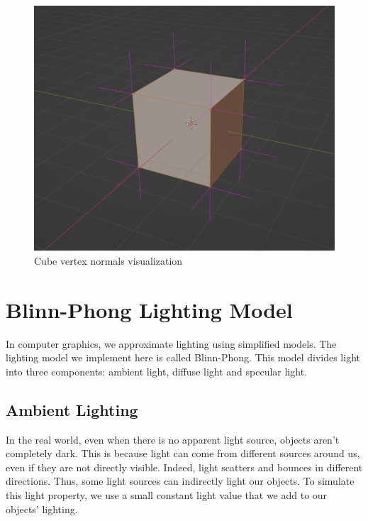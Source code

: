 \begin{figure}[H]
    \centering
    \includegraphics[scale=0.30]{images/ChBlinnPhong/CubeVertexNormals.png}
    \caption{Cube vertex normals visualization}
    \label{fig::CubeVertexNormals}
\end{figure}

\section{Blinn-Phong Lighting Model}

In computer graphics, we approximate lighting using simplified models.
The lighting model we implement here is called Blinn-Phong.
This model divides light into three components: ambient light, diffuse light and
specular light.

\subsection{Ambient Lighting}

In the real world, even when there is no apparent light source,
objects aren't completely dark.
This is because light can come from different sources around us, even if
they are not directly visible.
Indeed, light scatters and bounces in different directions.
Thus, some light sources can indirectly light our objects.
To simulate this light property, we use a small constant light value that we
add to our objects' lighting.

\begin{minipage}{\linewidth}{\noindent}
    
\end{minipage}

